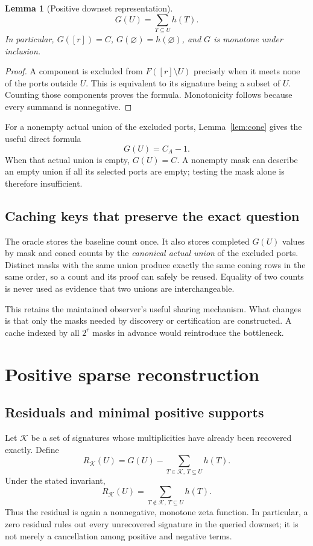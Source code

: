 \documentclass[11pt,letterpaper]{article}
\newtheorem{lemma}[theorem]{Lemma}
\begin{document}
\begin{lemma}[Positive downset representation]
\label{lem:zeta}
\[
 G(U)=\sum_{T\subseteq U}h(T).
\]
In particular, $G([r])=C$, $G(\varnothing)=h(\varnothing)$, and $G$ is
monotone under inclusion.
\end{lemma}
\begin{proof}
A component is excluded from $F([r]\setminus U)$ precisely when it meets none
of the ports outside $U$. This is equivalent to its signature being a subset
of $U$. Counting those components proves the formula. Monotonicity follows
because every summand is nonnegative.
\end{proof}

For a nonempty actual union of the excluded ports, Lemma~\ref{lem:cone} gives
the useful direct formula
\begin{equation}
 \label{eq:direct}
 G(U)=C_A-1.
\end{equation}
When that actual union is empty, $G(U)=C$. A nonempty mask can describe an
empty union if all its selected ports are empty; testing the mask alone is
therefore insufficient.

\subsection{Caching keys that preserve the exact question}
The oracle stores the baseline count once. It also stores completed $G(U)$
values by mask and coned counts by the \emph{canonical actual union} of the
excluded ports. Distinct masks with the same union produce exactly the same
coning rows in the same order, so a count and its proof can safely be reused.
Equality of two counts is never used as evidence that two unions are
interchangeable.

This retains the maintained observer's useful sharing mechanism. What changes
is that only the masks needed by discovery or certification are constructed.
A cache indexed by all $2^r$ masks in advance would reintroduce the bottleneck.

\section{Positive sparse reconstruction}
\label{sec:recovery}

\subsection{Residuals and minimal positive supports}
Let $\mathcal K$ be a set of signatures whose multiplicities have already
been recovered exactly. Define
\begin{equation}
\label{eq:residual}
 R_{\mathcal K}(U)=G(U)-\sum_{T\in\mathcal K,\,T\subseteq U}h(T).
\end{equation}
Under the stated invariant,
\[
 R_{\mathcal K}(U)=\sum_{T\notin\mathcal K,\,T\subseteq U}h(T).
\]
Thus the residual is again a nonnegative, monotone zeta function. In
particular, a zero residual rules out every unrecovered signature in the
queried downset; it is not merely a cancellation among positive and negative
terms.
\end{document}
